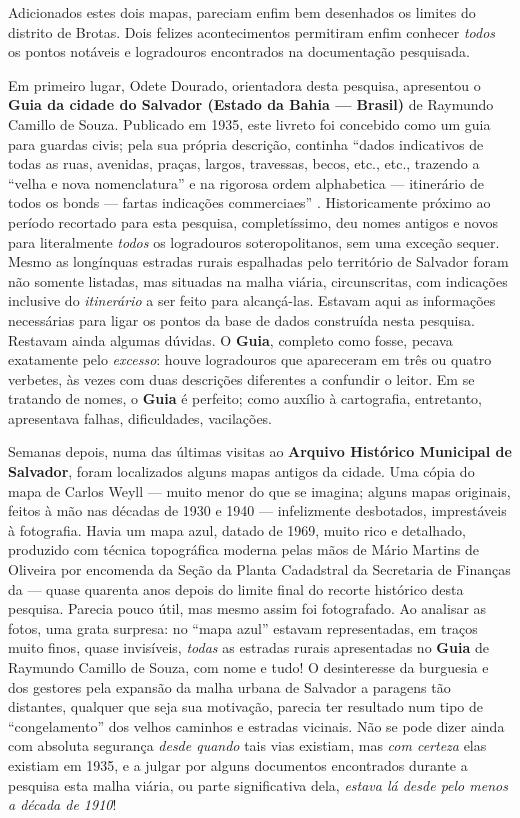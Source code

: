 Adicionados estes dois mapas, pareciam enfim bem desenhados os limites do distrito de Brotas. Dois felizes acontecimentos permitiram enfim conhecer \textit{todos} os pontos notáveis e logradouros encontrados na documentação pesquisada.

Em primeiro lugar, Odete Dourado, orientadora desta pesquisa, apresentou o \textbf{Guia da cidade do Salvador (Estado da Bahia --- Brasil)} de Raymundo Camillo de Souza. Publicado em 1935, este livreto foi concebido como um guia para guardas civis; pela sua própria descrição, continha ``dados indicativos de todas as ruas, avenidas, praças, largos, travessas, becos, etc., etc., trazendo a ``velha e nova nomenclatura'' e na rigorosa ordem alphabetica --- itinerário de todos os bonds --- fartas indicações commerciaes'' \cite{souza_guia_1935}. Historicamente próximo ao período recortado para esta pesquisa, completíssimo, deu nomes antigos e novos para literalmente \textit{todos} os logradouros soteropolitanos, sem uma exceção sequer. Mesmo as longínquas estradas rurais espalhadas pelo território de Salvador foram não somente listadas, mas situadas na malha viária, circunscritas, com indicações inclusive do \textit{itinerário} a ser feito para alcançá-las. Estavam aqui as informações necessárias para ligar os pontos da base de dados construída nesta pesquisa. Restavam ainda algumas dúvidas. O \textbf{Guia}, completo como fosse, pecava exatamente pelo \textit{excesso}: houve logradouros que apareceram em três ou quatro verbetes, às vezes com duas descrições diferentes a confundir o leitor. Em se tratando de nomes, o \textbf{Guia} é perfeito; como auxílio à cartografia, entretanto, apresentava falhas, dificuldades, vacilações. 

Semanas depois, numa das últimas visitas ao \textbf{Arquivo Histórico Municipal de Salvador}, foram localizados alguns mapas antigos da cidade. Uma cópia do mapa de Carlos Weyll --- muito menor do que se imagina; alguns mapas originais, feitos à mão nas décadas de 1930 e 1940 --- infelizmente desbotados, imprestáveis à fotografia. Havia um mapa azul, datado de 1969, muito rico e detalhado, produzido com técnica topográfica moderna pelas mãos de Mário Martins de Oliveira por encomenda da Seção da Planta Cadadstral da Secretaria de Finanças da  --- quase quarenta anos depois do limite final do recorte histórico desta pesquisa. Parecia pouco útil, mas mesmo assim foi fotografado. Ao analisar as fotos, uma grata surpresa: no ``mapa azul'' estavam representadas, em traços muito finos, quase invisíveis, \textit{todas} as estradas rurais apresentadas no \textbf{Guia} de Raymundo Camillo de Souza, com nome e tudo! O desinteresse da burguesia e dos gestores pela expansão da malha urbana de Salvador a paragens tão distantes, qualquer que seja sua motivação, parecia ter resultado num tipo de ``congelamento'' dos velhos caminhos e estradas vicinais. Não se pode dizer ainda com absoluta segurança \textit{desde quando} tais vias existiam, mas \textit{com certeza} elas existiam em 1935, e a julgar por alguns documentos encontrados durante a pesquisa esta malha viária, ou parte significativa dela, \textit{estava lá desde pelo menos a década de 1910}!

